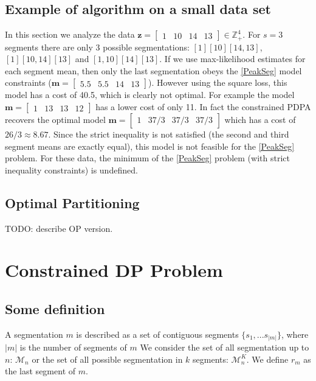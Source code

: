 \documentclass{article}
\newcommand{\ZZ}{\mathbb Z}
\begin{document}
\subsection{Example of algorithm on a small data set}

In this section we analyze the data
$\mathbf z = \left[\begin{array}{cccc} 1 & 10 & 14 & 13
\end{array}\right]\in\ZZ_+^4
$. For $s=3$ segments there are only 3 possible segmentations:
$[1][10][14, 13]$, $[1][10, 14][13]$ and $[1, 10][14][13]$. If we use
max-likelihood estimates for each segment mean, then only the last
segmentation obeys the \ref{PeakSeg} model constraints
($\mathbf m =\left[\begin{array}{cccc} 5.5 & 5.5 & 14 &
    13\end{array}\right]$). However using the square loss, this model
has a cost of 40.5, which is clearly not optimal. For example the
model
$\mathbf m =\left[\begin{array}{cccc} 1 & 13 & 13 &
    12\end{array}\right]$ has a lower cost of only 11. In fact the
constrained PDPA recovers the optimal model
$\mathbf m =\left[\begin{array}{cccc} 1 & 37/3 & 37/3 &
    37/3\end{array}\right]$ which has a cost of $26/3\approx
8.67$. Since the strict inequality is not satisfied (the second and
third segment means are exactly equal), this model is not feasible for
the \ref{PeakSeg} problem. For these data, the minimum of the
\ref{PeakSeg} problem (with strict inequality constraints) is
undefined.

\subsection{Optimal Partitioning}

TODO: describe OP version.

\newcommand{\FCC}{\widetilde{C}}
\newcommand{\M}{\mathcal{M}}
\section{Constrained DP Problem}
\subsection{Some definition}

A segmentation $m$ is described as a set of contiguous segments $\{s_1, ... s_|m|\}$, where $|m|$ is the number of segments of $m$
We consider the set of all segmentation up to $n$: $\M_n$ 
or the set of all possible segmentation in $k$ segments: $\M^K_n$.
We define $r_m$ as the last segment of $m$.
\end{document}

